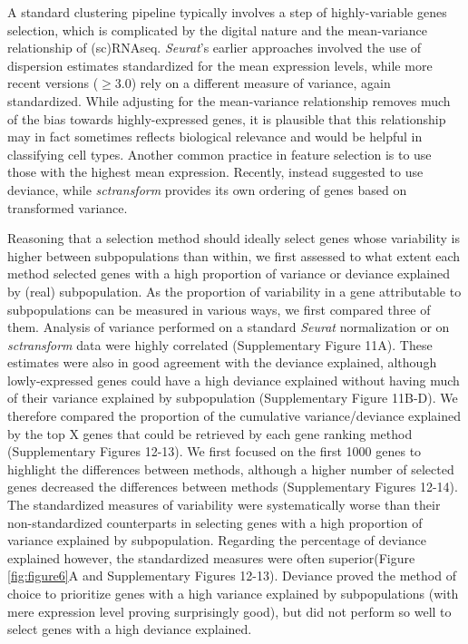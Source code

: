 \documentclass{bmcart}
\begin{document}
A standard clustering pipeline typically involves a step of highly-variable genes selection, which is complicated by the digital nature and the mean-variance relationship of (sc)RNAseq. \textit{Seurat}'s earlier approaches involved the use of dispersion estimates standardized for the mean expression levels, while more recent versions ($\geq$3.0) rely on a different measure of variance, again standardized. While adjusting for the mean-variance relationship removes much of the bias towards highly-expressed genes, it is plausible that this relationship may in fact sometimes reflects biological relevance and would be helpful in classifying cell types. Another common practice in feature selection is to use those with the highest mean expression. Recently, \citep{townesGlmpca2019} instead suggested to use deviance, while \textit{sctransform} provides its own ordering of genes based on transformed variance.

Reasoning that a selection method should ideally select genes whose variability is higher between subpopulations than within, we first assessed to what extent each method selected genes with a high proportion of variance or deviance explained by (real) subpopulation. As the proportion of variability in a gene attributable to subpopulations can be measured in various ways, we first compared three of them. Analysis of variance performed on a standard \textit{Seurat} normalization or on \textit{sctransform} data were highly correlated (Supplementary Figure 11A). These estimates were also in good agreement with the deviance explained, although lowly-expressed genes could have a high deviance explained without having much of their variance explained by subpopulation (Supplementary Figure 11B-D). We therefore compared the proportion of the cumulative variance/deviance explained by the top X genes that could be retrieved by each gene ranking method (Supplementary Figures 12-13). We first focused on the first 1000 genes to highlight the differences between methods, although a higher number of selected genes decreased the differences between methods (Supplementary Figures 12-14). The standardized measures of variability were systematically worse than their non-standardized counterparts in selecting genes with a high proportion of variance explained by subpopulation. Regarding the percentage of deviance explained however, the standardized measures were often superior(Figure \ref{fig:figure6}A and Supplementary Figures 12-13). Deviance proved the method of choice to prioritize genes with a high variance explained by subpopulations (with mere expression level proving surprisingly good), but did not perform so well to select genes with a high deviance explained.
\end{document}
